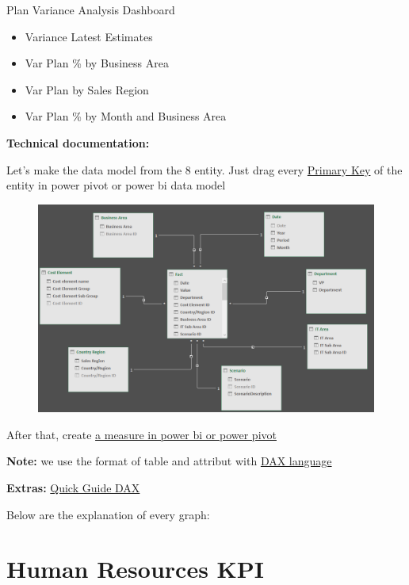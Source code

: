 \documentclass[]{book}
\providecommand{\tightlist}{%
  \setlength{\itemsep}{0pt}\setlength{\parskip}{0pt}}
\begin{document}
Plan Variance Analysis Dashboard

\begin{itemize}
\tightlist
\item
  Variance Latest Estimates
\item
  Var Plan \% by Business Area
\item
  Var Plan by Sales Region
\item
  Var Plan \% by Month and Business Area
\end{itemize}

\textbf{Technical documentation: }

Let's make the data model from the 8 entity. Just drag every
\href{https://en.wikipedia.org/wiki/Primary_key}{Primary Key} of the
entity in power pivot or power bi data model

\begin{figure}
\centering
\includegraphics{itspend.PNG}
\caption{}
\end{figure}

After that, create
\href{https://docs.microsoft.com/en-us/power-bi/desktop-tutorial-create-measures}{a
measure in power bi or power pivot}

\textbf{Note:} we use the format of table and attribut with
\href{https://docs.microsoft.com/en-us/power-bi/desktop-quickstart-learn-dax-basics}{DAX
language}

\textbf{Extras:}
\href{https://support.office.com/en-us/article/quickstart-learn-dax-basics-in-30-minutes-51744643-c2a5-436a-bdf6-c895762bec1a?omkt=en-US\&ui=en-US\&rs=en-US\&ad=US}{Quick
Guide DAX}

Below are the explanation of every graph:

\section{Human Resources KPI}\label{human-resources-kpi}
\end{document}
